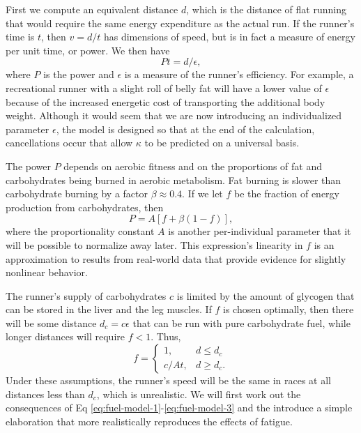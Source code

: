 \documentclass[10pt,letterpaper]{article}
\begin{document}
First we compute an equivalent distance $d$, which is the distance of flat running that would
require the same energy expenditure as the actual run. If the runner's time is $t$, then
$v=d/t$ has dimensions of speed, but is in fact a measure of energy per unit time, or power.
We then have
\begin{equation}\label{eq:fuel-model-1}
  Pt=d/\epsilon,
\end{equation}
where $P$ is the power and $\epsilon$ is a measure of the runner's efficiency. For example,
a recreational runner with a slight roll of belly fat will have a lower value of $\epsilon$ because of
the increased energetic cost of transporting the additional body weight. Although it would seem that
we are now introducing an individualized parameter $\epsilon$, the model is designed so that at the
end of the calculation, cancellations occur that allow $\kappa$ to be predicted on a universal basis.

The power $P$ depends on aerobic fitness and on the proportions of fat and carbohydrates being
burned in aerobic metabolism. Fat burning is slower than carbohydrate burning by a factor $\beta\approx 0.4$.\cite{rapoport}
If we let $f$ be the fraction of energy production from carbohydrates, then
\begin{equation}\label{eq:fuel-model-2}
  P = A[f+\beta(1-f)],
\end{equation}
where the proportionality constant $A$ is another per-individual parameter that it will be
possible to normalize away later. This expression's linearity in $f$ is an approximation to
results from real-world data that provide evidence for slightly nonlinear behavior.\cite{rapoport}

The runner's supply of carbohydrates $c$ is limited by the amount of glycogen that can be stored
in the liver and the leg muscles. If $f$ is chosen optimally, then there will be some distance
$d_c=c\epsilon$ that can be run with pure carbohydrate fuel, while longer distances will require $f<1$.
Thus,
\begin{equation}\label{eq:fuel-model-3}
  f = \begin{cases}
    1, & d\le d_c \\
    c/At, & d\ge d_c.
\end{cases}
\end{equation}
Under these assumptions, the runner's speed will be the same in races at all distances less than $d_c$,
which is unrealistic. We will first work out the consequences of Eq \ref{eq:fuel-model-1}-\ref{eq:fuel-model-3}
and the introduce a simple elaboration that more realistically reproduces the effects of fatigue.
\end{document}
